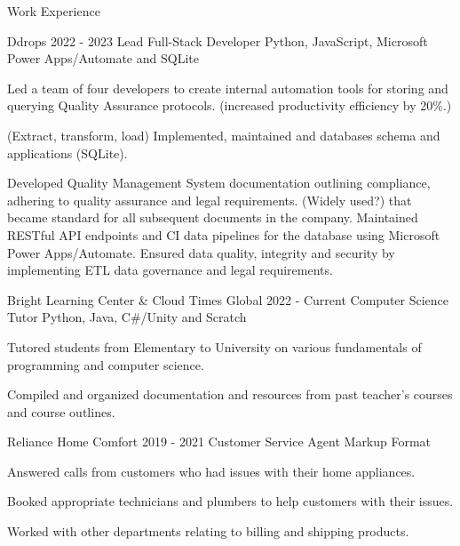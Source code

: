 \documentclass{resume}
\begin{document}
    \begin{rSection}{Work Experience}
        \begin{rSubsection}
        {Ddrops}
        {2022 - 2023}
        {Lead Full-Stack Developer}
        {Python, JavaScript, Microsoft Power Apps/Automate and SQLite}
            \item Led a team of four developers to create internal automation tools for storing and querying Quality Assurance protocols. (increased productivity efficiency by 20\%.)
            \item (Extract, transform, load) Implemented, maintained and databases schema and applications (SQLite).
            \item Developed Quality Management System documentation outlining compliance, adhering to quality assurance and legal requirements. (Widely used?) that became standard for all subsequent documents in the company.
            Maintained RESTful API endpoints and CI data pipelines for the database using Microsoft Power Apps/Automate. Ensured data quality, integrity and security by implementing ETL data governance and legal requirements. 
        \end{rSubsection}
    
        \begin{rSubsection}
        {Bright Learning Center \& Cloud Times Global}
        {2022 - Current}
        {Computer Science Tutor}
        {Python, Java, C\#/Unity and Scratch}
            \item Tutored students from Elementary to University on various fundamentals of programming and computer science.
            \item Compiled and organized documentation and resources from past teacher's courses and course outlines.
        \end{rSubsection}
    
        \begin{rSubsection}
        {Reliance Home Comfort}
        {2019 - 2021}
        {Customer Service Agent}
        {Markup Format}
            \item Answered calls from customers who had issues with their home appliances.
            \item Booked appropriate technicians and plumbers to help customers with their issues.
            \item Worked with other departments relating to billing and shipping products.
        \end{rSubsection}
    

\end{rSection}
\end{document}
